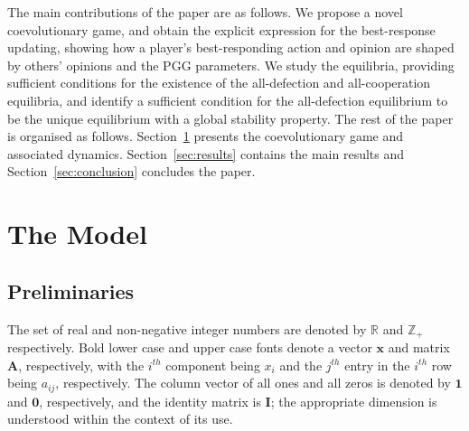 \documentclass[letterpaper, 10 pt, conference]{ieeeconf}  %
\newcommand{\vect}[1]{\boldsymbol{#1}}
\begin{document}
The main contributions of the paper are as follows. We propose a novel coevolutionary game, and obtain the explicit expression for the best-response updating, showing how a player's best-responding action and opinion are shaped by others' opinions and the PGG parameters. We study the equilibria, providing sufficient conditions for the existence of the all-defection and all-cooperation equilibria, and identify a sufficient condition for the all-defection equilibrium to be the unique equilibrium with a global stability property. The rest of the paper is organised as follows. Section~\ref{sec:model} presents the coevolutionary game and associated dynamics. Section~\ref{sec:results} contains the main results and Section~\ref{sec:conclusion} concludes the paper.



\section{The Model}\label{sec:model}

\subsection{Preliminaries}
The set of real and non-negative integer numbers are denoted by $\mathbb{R}$ and $\mathbb{Z}_+$ respectively. Bold lower case and upper case fonts denote a vector $\vect{x}$ and matrix $\vect{A}$, respectively, with the $i^{th}$ component being $x_i$ and the $j^{th}$ entry in the $i^{th}$ row being $a_{ij}$, respectively. The column vector of all ones and all zeros is denoted by $\vect{1}$ and $\vect 0$, respectively, and the identity matrix is $\vect{I}$; the appropriate dimension is understood within the context of its use. 
\end{document}
